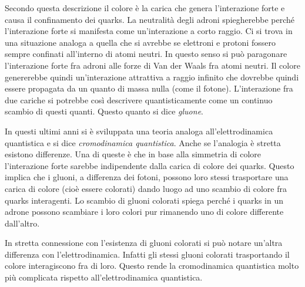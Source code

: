 Secondo questa descrizione il colore è la carica che genera l'interazione 
forte e causa il confinamento dei quarks.
La neutralità degli adroni spiegherebbe perché l'interazione forte si 
manifesta come un'interazione a corto raggio.
Ci si trova in una situazione analoga a quella che si avrebbe se elettroni e 
protoni fossero sempre confinati
all'interno di atomi neutri.
In questo senso si può paragonare l'interazione forte fra adroni alle forze di 
Van der Waals fra atomi neutri.
Il colore genererebbe quindi un'interazione attrattiva a raggio infinito che 
dovrebbe quindi essere propagata da
un quanto di massa nulla (come il fotone).
L'interazione fra due cariche si potrebbe così descrivere quantisticamente 
come un continuo scambio di questi
quanti. Questo quanto si dice \textit{gluone}.

In questi ultimi anni si è sviluppata una teoria analoga all'elettrodinamica 
quantistica e si
dice \textit{cromodinamica quantistica}.
Anche se l'analogia è stretta esistono differenze. Una di queste è che in 
base alla simmetria di colore
l'interazione forte sarebbe indipendente dalla carica di colore dei quarks.
Questo implica che i gluoni, a differenza dei fotoni, possono loro stessi 
trasportare una carica di colore (cioè
essere colorati) dando luogo ad uno scambio di colore fra quarks interagenti.
Lo scambio di gluoni colorati spiega perché i quarks in un adrone possono 
scambiare i loro colori pur rimanendo uno
di colore differente dall'altro.

In stretta connessione con l'esistenza di gluoni colorati si può notare 
un'altra differenza con l'elettrodinamica.
Infatti gli stessi gluoni colorati trasportando il colore interagiscono fra di 
loro.
Questo rende la cromodinamica quantistica molto più complicata rispetto 
all'elettrodinamica quantistica.

